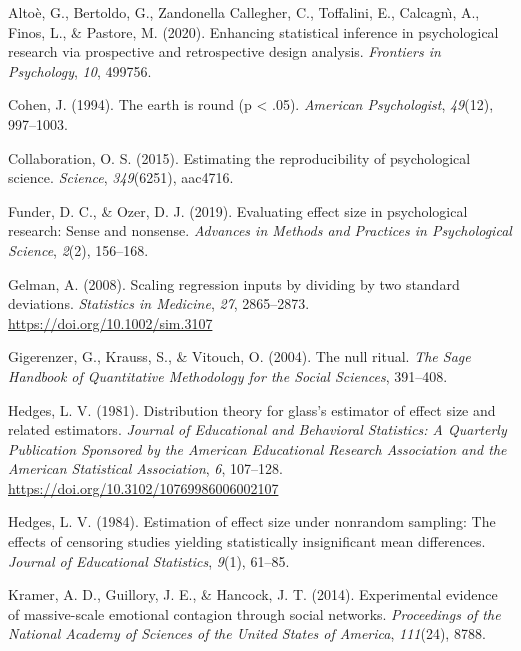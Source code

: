 \documentclass[
  man]{apa7}
\newlength{\cslhangindent}
\newenvironment{CSLReferences}[2] %
 {\begin{list}{}{%
  \setlength{\itemindent}{0pt}
  \setlength{\leftmargin}{0pt}
  \setlength{\parsep}{0pt}
  \ifodd #1
   \setlength{\leftmargin}{\cslhangindent}
   \setlength{\itemindent}{-1\cslhangindent}
  \fi
  \setlength{\itemsep}{#2\baselineskip}}}
 {\end{list}}
\begin{document}
\label{refs}
\begin{CSLReferences}{1}{0}
Altoè, G., Bertoldo, G., Zandonella Callegher, C., Toffalini, E., Calcagnı̀, A., Finos, L., \& Pastore, M. (2020). Enhancing statistical inference in psychological research via prospective and retrospective design analysis. \emph{Frontiers in Psychology}, \emph{10}, 499756.

Cohen, J. (1994). The earth is round (p \textless{} .05). \emph{American Psychologist}, \emph{49}(12), 997--1003.

Collaboration, O. S. (2015). Estimating the reproducibility of psychological science. \emph{Science}, \emph{349}(6251), aac4716.

Funder, D. C., \& Ozer, D. J. (2019). Evaluating effect size in psychological research: Sense and nonsense. \emph{Advances in Methods and Practices in Psychological Science}, \emph{2}(2), 156--168.

Gelman, A. (2008). Scaling regression inputs by dividing by two standard deviations. \emph{Statistics in Medicine}, \emph{27}, 2865--2873. \url{https://doi.org/10.1002/sim.3107}

Gigerenzer, G., Krauss, S., \& Vitouch, O. (2004). The null ritual. \emph{The Sage Handbook of Quantitative Methodology for the Social Sciences}, 391--408.

Hedges, L. V. (1981). Distribution theory for glass's estimator of effect size and related estimators. \emph{Journal of Educational and Behavioral Statistics: A Quarterly Publication Sponsored by the American Educational Research Association and the American Statistical Association}, \emph{6}, 107--128. \url{https://doi.org/10.3102/10769986006002107}

Hedges, L. V. (1984). Estimation of effect size under nonrandom sampling: The effects of censoring studies yielding statistically insignificant mean differences. \emph{Journal of Educational Statistics}, \emph{9}(1), 61--85.

Kramer, A. D., Guillory, J. E., \& Hancock, J. T. (2014). Experimental evidence of massive-scale emotional contagion through social networks. \emph{Proceedings of the National Academy of Sciences of the United States of America}, \emph{111}(24), 8788.


\end{CSLReferences}
\end{document}
